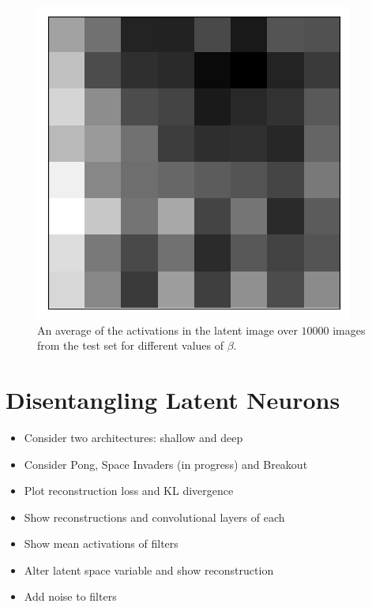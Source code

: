 \begin{figure}[h!]
\begin{multicols}{3}
    \includegraphics[scale=0.4]{figures/results/latent_image/beta_4_average_activation.png}
    \caption{$\beta=4$}
\end{multicols}
\caption{An average of the activations in the latent image over $10000$ images from the test set for different values of $\beta$.}
\label{fig:latent_image_originals_posterior_samples}
\end{figure}

%
%
%
%
%
\section{Disentangling Latent Neurons}
\begin{itemize}
\item Consider two architectures: shallow and deep
\item Consider Pong, Space Invaders (in progress) and Breakout
\item Plot reconstruction loss and KL divergence
\item Show reconstructions and convolutional layers of each
\item Show mean activations of filters
\item Alter latent space variable and show reconstruction
\item Add noise to filters
\end{itemize}



